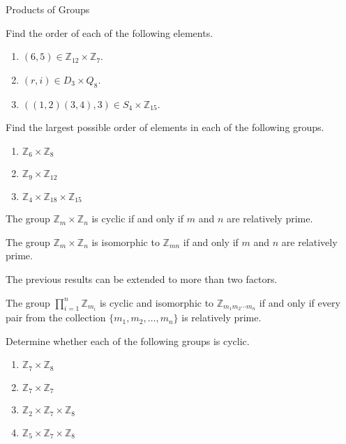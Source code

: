 \begin{section}{Products of Groups}
\begin{problem}
Find the order of each of the following elements.
\begin{enumerate}[label=\textrm{(\alph*)}]
\item $(6,5)\in\mathbb{Z}_{12}\times \mathbb{Z}_7$.
\item $(r,i)\in D_3\times Q_8$.
\item $((1,2)(3,4),3)\in S_4\times \mathbb{Z}_{15}$.
\end{enumerate}
\end{problem}

\begin{problem}
Find the largest possible order of elements in each of the following groups.
\begin{enumerate}[label=\textrm{(\alph*)}]
\item $\mathbb{Z}_6\times \mathbb{Z}_8$
\item $\mathbb{Z}_9\times \mathbb{Z}_{12}$
\item $\mathbb{Z}_4\times \mathbb{Z}_{18}\times \mathbb{Z}_{15}$
\end{enumerate}
\end{problem}

\begin{theorem}
The group $\mathbb{Z}_m\times \mathbb{Z}_n$ is cyclic if and only if $m$ and $n$ are relatively prime.
\end{theorem}

\begin{corollary}
The group $\mathbb{Z}_m\times \mathbb{Z}_n$ is isomorphic to $\mathbb{Z}_{mn}$ if and only if $m$ and $n$ are relatively prime.
\end{corollary}

The previous results can be extended to more than two factors.

\begin{theorem}
The group $\prod_{i=1}^n \mathbb{Z}_{m_i}$ is cyclic and isomorphic to $\mathbb{Z}_{m_1m_2\cdots m_n}$ if and only if every pair from the collection $\{m_1,m_2,\ldots, m_n\}$ is relatively prime.
\end{theorem}

\begin{problem}
Determine whether each of the following groups is cyclic.
\begin{enumerate}[label=\textrm{(\alph*)}]
\item $\mathbb{Z}_7\times \mathbb{Z}_8$
\item $\mathbb{Z}_7\times \mathbb{Z}_7$
\item $\mathbb{Z}_2\times \mathbb{Z}_7\times \mathbb{Z}_8$
\item $\mathbb{Z}_5\times \mathbb{Z}_7\times \mathbb{Z}_8$
\end{enumerate}
\end{problem}


\end{section}
